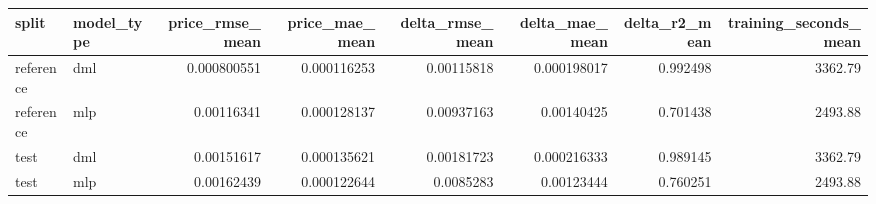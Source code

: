 \begin{tabular}{llrrrrrr}
\toprule
split & model_type & price_rmse_mean & price_mae_mean & delta_rmse_mean & delta_mae_mean & delta_r2_mean & training_seconds_mean \\
\midrule
reference & dml & 0.000800551 & 0.000116253 & 0.00115818 & 0.000198017 & 0.992498 & 3362.79 \\
reference & mlp & 0.00116341 & 0.000128137 & 0.00937163 & 0.00140425 & 0.701438 & 2493.88 \\
test & dml & 0.00151617 & 0.000135621 & 0.00181723 & 0.000216333 & 0.989145 & 3362.79 \\
test & mlp & 0.00162439 & 0.000122644 & 0.0085283 & 0.00123444 & 0.760251 & 2493.88 \\
\bottomrule
\end{tabular}
